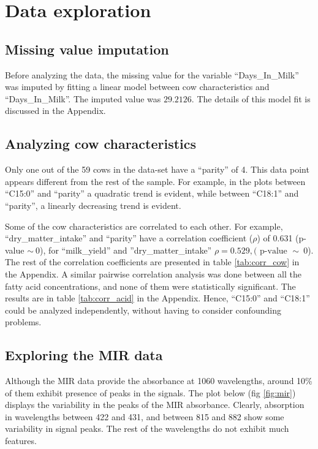 \section*{Data exploration} \label{Sec_Data}
\subsection*{Missing value imputation}
Before analyzing the data, the missing value for the variable ``Days\_In\_Milk'' was imputed by fitting a linear model between cow characteristics and ``Days\_In\_Milk''. The imputed value was $29.2126$. The details of this model fit is discussed in the Appendix. 

\subsection*{Analyzing cow characteristics}
Only one out of the 59 cows in the data-set have a ``parity'' of 4. This data point appears different from the rest of the sample. For example, in the plots between ``C15:0'' and ``parity'' a quadratic trend is evident, while between ``C18:1'' and ``parity'', a linearly decreasing trend is evident. 


Some of the cow characteristics are correlated to each other. For example, ``dry\_matter\_intake'' and ``parity'' have a correlation coefficient ($\rho$) of 0.631 (p-value $\sim \ 0$), for ``milk\_yield'' and ''dry\_matter\_intake'' $\rho = 0.529, (\text{ p-value } \sim \ 0$). The rest of the correlation coefficients are presented in table \ref{tab:corr_cow} in the Appendix. A similar pairwise correlation analysis was done between all the fatty acid concentrations, and none of them were statistically significant. The results are in table \ref{tab:corr_acid} in the Appendix. Hence, ``C15:0'' and ``C18:1'' could be analyzed independently, without having to consider confounding problems. 

\subsection*{Exploring the MIR data}
Although the MIR data provide the absorbance at 1060 wavelengths, around 10\% of them exhibit presence of peaks in the signals. The plot below (fig \ref{fig:mir}) displays the variability in the peaks of the MIR absorbance.
Clearly, absorption in wavelengths between 422 and 431, and between 815 and 882 show some variability in signal peaks. The rest of the wavelengths do not exhibit much features. 

